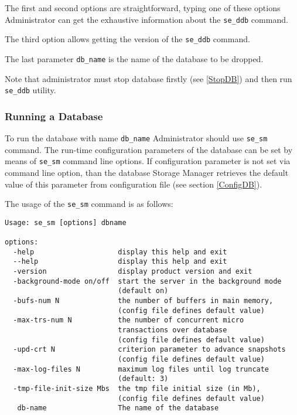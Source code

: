 \documentclass[a4paper,12pt]{article}
\begin{document}
The first and second options are straightforward, typing one of these options
Administrator can get the exhaustive information about the \verb!se_ddb!
command.

The third option allows getting the version of the \verb!se_ddb! command.

The last parameter \verb!db_name! is the name of the database to be dropped.

Note that administrator must stop database firstly (see \ref{StopDB}) and then
run \verb!se_ddb! utility.


\subsubsection{Running a Database}
\label{RunDB}

To run the database with name \verb!db_name! Administrator should use
\verb!se_sm! command. The run-time configuration parameters of the database can
be set by means of \verb!se_sm! command line options. If configuration parameter
is not set via command line option, than the database Storage Manager retrieves
the default value of this parameter from configuration file (see section
\ref{ConfigDB}).

The usage of the \verb!se_sm! command is as follows:

\small{
\begin{verbatim}
Usage: se_sm [options] dbname

options:
  -help                    display this help and exit
  --help                   display this help and exit
  -version                 display product version and exit
  -background-mode on/off  start the server in the background mode
                           (default on)
  -bufs-num N              the number of buffers in main memory,
                           (config file defines default value)
  -max-trs-num N           the number of concurrent micro
                           transactions over database
                           (config file defines default value)
  -upd-crt N               criterion parameter to advance snapshots
                           (config file defines default value)
  -max-log-files N         maximum log files until log truncate
                           (default: 3)
  -tmp-file-init-size Mbs  the tmp file initial size (in Mb),
                           (config file defines default value)
   db-name                 The name of the database
\end{verbatim}}
\end{document}
